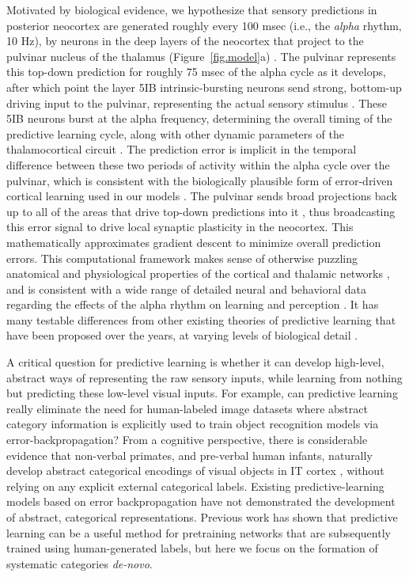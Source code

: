 \documentclass[12pt,twoside]{nature}
\newif\myifpdf
\begin{document}
Motivated by biological evidence, we hypothesize that sensory predictions in posterior neocortex are generated roughly every 100 msec (i.e., the {\em alpha} rhythm, 10 Hz), by neurons in the deep layers of the neocortex that project to the pulvinar nucleus of the thalamus (Figure~\ref{fig.model}a) \cite{OReillyWyatteRohrlich14}.  The pulvinar represents this top-down prediction for roughly 75 msec of the alpha cycle as it develops, after which point the layer 5IB intrinsic-bursting neurons send strong, bottom-up driving input to the pulvinar, representing the actual sensory stimulus \cite{ShermanGuillery06}.  These 5IB neurons burst at the alpha frequency, determining the overall timing of the predictive learning cycle, along with other dynamic parameters of the thalamocortical circuit \cite{LorinczKekesiJuhaszEtAl09,FranceschettiGuatteoPanzicaEtAl95,SaalmannPinskWangEtAl12}.  The prediction error is implicit in the temporal difference between these two periods of activity within the alpha cycle over the pulvinar, which is consistent with the biologically plausible form of error-driven cortical learning used in our models \cite{OReilly96}.  The pulvinar sends broad projections back up to all of the areas that drive top-down predictions into it \cite{Shipp03,Mumford91}, thus broadcasting this error signal to drive local synaptic plasticity in the neocortex. This mathematically approximates gradient descent to minimize overall prediction errors.  This computational framework makes sense of otherwise puzzling anatomical and physiological properties of the cortical and thalamic networks \cite{ShermanGuillery06}, and is consistent with a wide range of detailed neural and behavioral data regarding the effects of the alpha rhythm on learning and perception \cite{BuffaloFriesLandmanEtAl11,VanRullenKoch03,JensenBonnefondVanRullen12,FiebelkornKastner19}.  It has many testable differences from other existing theories of predictive learning that have been proposed over the years, at varying levels of biological detail \cite{Mumford92,RaoBallard99,KawatoHayakawaInui93,Friston05}.

A critical question for predictive learning is whether it can develop high-level, abstract ways of representing the raw sensory inputs, while learning from nothing but predicting these low-level visual inputs.  For example, can predictive learning really eliminate the need for human-labeled image datasets where abstract category information is explicitly used to train object recognition models via error-backpropagation?  From a cognitive perspective, there is considerable evidence that non-verbal primates, and pre-verbal human infants, naturally develop abstract categorical encodings of visual objects in IT cortex \cite{CadieuHongYaminsEtAl14}, without relying on any explicit external categorical labels.  Existing predictive-learning models based on error backpropagation \cite{LotterKreimanCox16} have not demonstrated the development of abstract, categorical representations.  Previous work has shown that predictive learning can be a useful method for pretraining networks that are subsequently trained using human-generated labels, but here we focus on the formation of systematic categories {\em de-novo}.
\end{document}

